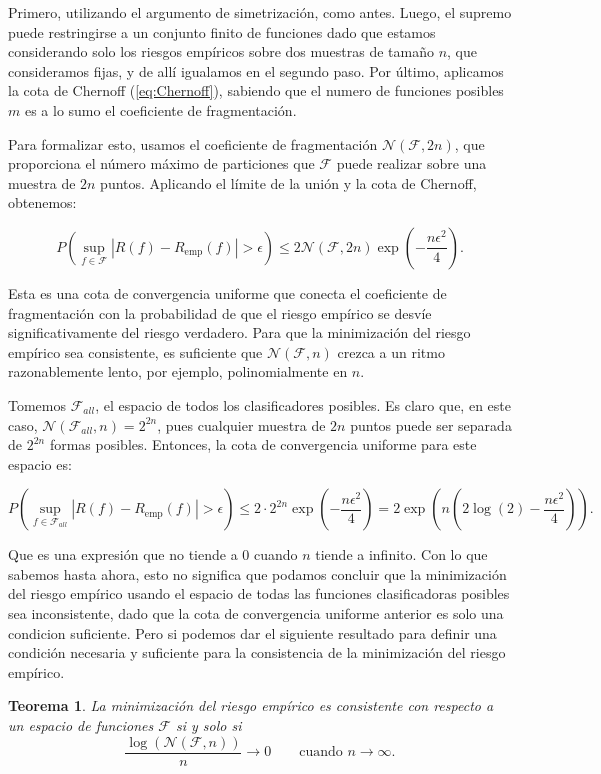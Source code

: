 \documentclass{report}
\newtheorem{thm}{Teorema}[subsection]
\begin{document}
Primero, utilizando el argumento de simetrización, como antes. Luego, el supremo puede restringirse a un conjunto finito de funciones
dado que estamos considerando solo los riesgos empíricos sobre dos muestras de tamaño $n$, que consideramos fijas, y de allí igualamos
en el segundo paso. Por último, aplicamos la cota de Chernoff (\ref{eq:Chernoff}), sabiendo que el numero de funciones
posibles $m$ es a lo sumo el coeficiente de fragmentación.\newline

Para formalizar esto, usamos el coeficiente de fragmentación \(\mathcal{N}(\mathcal{F}, 2n)\), que proporciona el número máximo 
de particiones que \(\mathcal{F}\) puede realizar sobre una muestra de \(2n\) puntos. Aplicando el límite de la unión 
y la cota de Chernoff, obtenemos:

\begin{equation} 
    P\left(\sup_{f \in \mathcal{F}} |R(f) - R_{\text{emp}}(f)| > \epsilon \right) \leq 
    2\mathcal{N}(\mathcal{F}, 2n) \exp\left(-\frac{n\epsilon^2}{4}\right). \label{eq: cota convergencia coeficiente fragmentacion}
\end{equation}

Esta es una cota de convergencia uniforme que conecta el coeficiente de fragmentación con la probabilidad de 
que el riesgo empírico se desvíe significativamente del riesgo verdadero. Para que la minimización del riesgo 
empírico sea consistente, es suficiente que $\mathcal{N}(\mathcal{F}, n)$ crezca a un ritmo razonablemente lento, por ejemplo, 
polinomialmente en \(n\).\newline

Tomemos $\mathcal{F}_{all}$, el espacio de todos los clasificadores posibles. Es claro que, en este caso, $\mathcal{N}(\mathcal{F}_{all}, n)=2^{2n}$,
pues cualquier muestra de $2n$ puntos puede ser separada de $2^{2n}$ formas posibles. Entonces, la cota de convergencia uniforme para este espacio
es:

\[
P\left(\sup_{f \in \mathcal{F}_{all}} |R(f) - R_{\text{emp}}(f)| > \epsilon \right) \leq
2\cdot 2^{2n} \exp\left(-\frac{n\epsilon^2}{4}\right) = 2\exp\left(n\left( 2\log(2) - \frac{n\epsilon^2}{4}\right)\right).
\]

Que es una expresión que no tiende a $0$ cuando $n$ tiende a infinito. Con lo que sabemos hasta ahora, esto no significa que podamos 
concluir que la minimización del riesgo empírico
usando el espacio de todas las funciones clasificadoras posibles sea inconsistente, dado que la cota de convergencia uniforme anterior
es solo una condicion suficiente. Pero si podemos dar el siguiente resultado para definir una condición necesaria y suficiente para
la consistencia de la minimización del riesgo empírico.
\begin{thm}\label{thm: consistencia ssi}
    La minimización del riesgo empírico es consistente con respecto a un espacio de funciones $\mathcal{F}$ si y solo si
    \[
    \frac{\log\left(\mathcal{N}(\mathcal{F}, n)\right)}{n} \rightarrow 0 \qquad \text{cuando } n \to \infty.
    \]
    
\end{thm}
\end{document}
